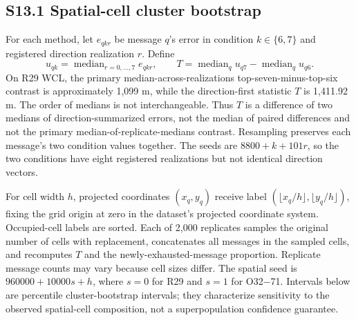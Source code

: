 \documentclass[journal,onecolumn,10pt]{IEEEtran}
\begin{document}
\subsection*{S13.1 Spatial-cell cluster bootstrap}

For each method, let $e_{qkr}$ be message $q$'s error in condition $k\in\{6,7\}$ and registered direction realization $r$. Define
\begin{equation}\label{eq:s-display-3}
u_{qk}=\operatorname{median}_{r=0,\ldots,7}e_{qkr},\qquad
 T=\operatorname{median}_q u_{q7}-\operatorname{median}_q u_{q6}.
\end{equation}
On R29 WCL, the primary median-across-realizations top-seven-minus-top-six contrast is approximately 1,099 m, while the direction-first statistic $T$ is 1,411.92 m. The order of medians is not interchangeable. Thus $T$ is a difference of two medians of direction-summarized errors, not the median of paired differences and not the primary median-of-replicate-medians contrast. Resampling preserves each message's two condition values together. The seeds are $8800+k+101r$, so the two conditions have eight registered realizations but not identical direction vectors.

For cell width $h$, projected coordinates $(x_q,y_q)$ receive label $(\lfloor x_q/h\rfloor,\lfloor y_q/h\rfloor)$, fixing the grid origin at zero in the dataset's projected coordinate system. Occupied-cell labels are sorted. Each of 2,000 replicates samples the original number of cells with replacement, concatenates all messages in the sampled cells, and recomputes $T$ and the newly-exhausted-message proportion. Replicate message counts may vary because cell sizes differ. The spatial seed is $960000+10000s+h$, where $s=0$ for R29 and $s=1$ for O32$-$71. Intervals below are percentile cluster-bootstrap intervals; they characterize sensitivity to the observed spatial-cell composition, not a superpopulation confidence guarantee.
\end{document}
